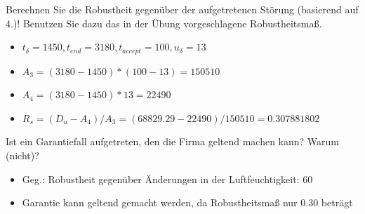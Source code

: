\documentclass{ocbeameruni}
\begin{document}
\begin{frame}{3.5}
Berechnen Sie die Robustheit gegenüber der aufgetretenen Störung (basierend auf 4.)! Benutzen
Sie dazu das in der Übung vorgeschlagene Robustheitsmaß.
    \begin{itemize}
    \item $t_{\delta} = 1450, t_{end} = 3180, t_{accept} = 100, u_{\delta} = 13$
    \item $A_3 = (3180-1450) * (100-13) = 150510$
    \item $A_4 = (3180-1450) * 13 = 22490$
    \item $R_s = (D_u - A_4) / A_3 = (68829.29 - 22490) / 150510 = 0.307881802$
    \end{itemize}
\end{frame}

\begin{frame}{3.6}
Ist ein Garantiefall aufgetreten, den die Firma geltend machen kann? Warum (nicht)?
    \begin{itemize}
    \item Geg.: Robustheit gegenüber Änderungen in der Luftfeuchtigkeit: 60 %
    \item Garantie kann geltend gemacht werden, da Robustheitsmaß nur 0.30 beträgt
    \end{itemize}
\end{frame}
\end{document}
